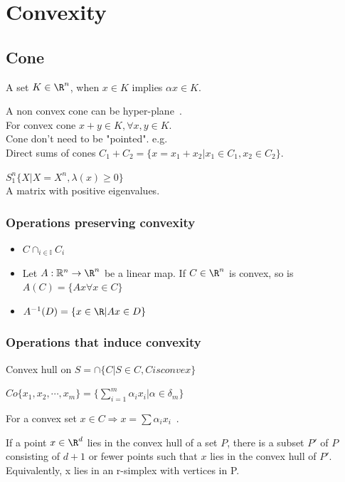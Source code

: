 \section{Convexity}
\subsection{Cone}
\begin{definition}[Cone]
A set $K \in \R^n$, when $x \in K $ implies $\alpha x \in K$.
\end{definition}
A non convex cone can be hyper-plane~\cite{aliPowderBedFusion2022}.\\
For convex cone $x + y \in K, \forall x,y \in K$.\\
Cone don't need to be "pointed". e.g. \\
Direct sums of cones $C_1 + C_2 = \{ x = x_1+x_2 | x_1 \in C_1, x_2 \in C_2 \}$.\\
\begin{example}
$S_1^n  \{ X | X=X^n ,\lambda(x) \ge 0\}$\\
A matrix with positive eigenvalues.
\end{example}

\subsubsection{Operations preserving convexity}
\begin{itemize}
\item[Intersection] $C  \cap_{i \in \mathbb{I}}C_i$
\item[Linear map] Let $A : \mathbb{R}^n \to  \R^n$ be a linear map. If $C \in \R^n$ is convex, so is $A(C) = \{Ax \forall x \in C \}$
\item[Inverse image] $A^{-1}(D) = \{ x \in \R |Ax \in D \}$
\end{itemize}

\subsubsection{Operations that induce convexity}
Convex hull on $S = \cap \{C | S\in C, C is convex\}$\\
\begin{example}
$Co \{ x_1,x_2,\cdots,x_m\} = \{ \sum_{i=1}^m \alpha_i x_i | \alpha \in \delta_m \}$
\end{example}
For a convex set $x \in C \Rightarrow x = \sum \alpha_i x_i$~\cite{aminComputationalHomogenizationElastic2018}. 
\begin{theorem}
If a point $x \in \R^d$ lies in the convex hull of a set $P$, there is a subset $P'$ of $P$ consisting of $d + 1$ or fewer points such that $x$ lies in the convex hull of $P'$. Equivalently, x lies in an r-simplex with vertices in P.
\end{theorem}


